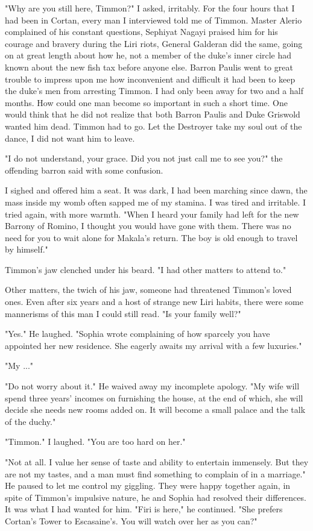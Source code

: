 \documentclass{article}
\begin{document}
"Why are you still here, Timmon?" I asked, irritably. For the four hours that I had been in Cortan, every man I interviewed told me of Timmon. Master Alerio complained  of his constant questions, Sephiyat Nagayi praised him for his courage and bravery during the Liri riots, General Galderan did the same, going on at great length about how he, not a member of the duke's inner circle had known about the new fish tax before anyone else. Barron Paulis went to great trouble to impress upon me how inconvenient and difficult it had been to keep the duke's men from arresting Timmon. I had only been away for two and a half months. How could one man become so important in such a short time. One would think that he did not realize that both Barron Paulis and Duke Griswold wanted him dead. Timmon had to go. Let the Destroyer take my soul out of the dance, I did not want him to leave. 

"I do not understand, your grace. Did you not just call me to see you?" the offending barron said with some confusion.

I sighed and offered him a seat. It was dark, I had been marching since dawn, the mass inside my womb often sapped me of my stamina. I was tired and irritable. I tried again, with more warmth. "When I heard your family had left for the new Barrony of Romino, I thought you would have gone with them. There was no need for you to wait alone for Makala's return. The boy is old enough to travel by himself."

Timmon's jaw clenched under his beard. "I had other matters to attend to."

Other matters, the twich of his jaw, someone had threatened Timmon's loved ones. Even after six years and a host of strange new Liri habits, there were some mannerisms of this man I could still read. "Is your family well?"

"Yes." He laughed. "Sophia wrote complaining of how sparcely you have appointed her new residence. She eagerly awaits my arrival with a few luxuries."

"My ..."

"Do not worry about it." He waived away my incomplete apology. "My wife will spend three years' incomes on furnishing the house, at the end of which, she will decide she needs new rooms added on. It will become a small palace and the talk of the duchy."

"Timmon." I laughed. "You are too hard on her."

"Not at all. I value her sense of taste and ability to entertain immensely. But they are not my tastes, and a man must find something to complain of in a marriage." He paused to let me control my giggling. They were happy together again, in spite of Timmon's impulsive nature, he and Sophia had resolved their differences. It was what I had wanted for him. "Firi is here," he continued. "She prefers Cortan's Tower to Escasaine's. You will watch over her as you can?"
\end{document}
